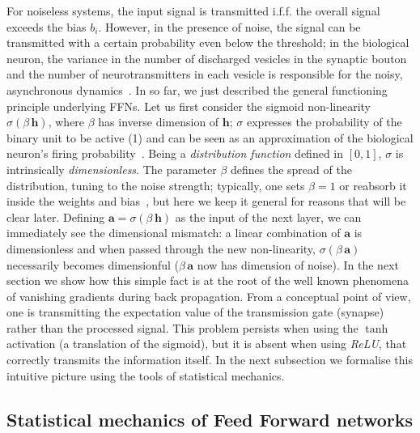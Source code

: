 \documentclass[5p]{elsarticle}
\begin{document}
For noiseless systems, the input signal is transmitted i.f.f. the overall signal exceeds the bias $b_i$. However, in the presence of noise, the signal can be transmitted with a certain probability even below the threshold; in the biological neuron, the variance in the number of discharged vesicles in the synaptic bouton and the number of neurotransmitters in each vesicle is responsible for the noisy, asynchronous dynamics~\cite{amit1}. In so far, we just described the general functioning principle underlying FFNs. Let us first consider the sigmoid non-linearity $\sigma(\beta \, \mathbf{h} )$, where $\beta$  has inverse dimension of $\mathbf{h}$;  $\sigma$ expresses the probability of the binary unit to be active (1) and can be seen as an approximation of the biological neuron's firing probability~\cite{amit1}. Being a {\it distribution function} defined in $[0,1]$, $\sigma$ is intrinsically {\it dimensionless}. The parameter $\beta$ defines the spread of the distribution, tuning to the noise strength; typically, one sets $\beta =1$ or reabsorb it inside the weights and bias~\cite{zecchina}, but here we keep it general for reasons that will be clear later. Defining $\mathbf{a} = \sigma(\beta \, \mathbf{h} )$ as the input of the next layer, we can immediately see the dimensional mismatch: a linear combination of $\mathbf{a}$ is dimensionless and when passed through the new non-linearity, $\sigma(\beta \, \mathbf{a} )$ necessarily becomes dimensionful ($\beta \, \mathbf{a}$ now has dimension of noise). In the next section we show how this simple fact is at the root of the well known phenomena of vanishing gradients during back propagation. From a conceptual point of view, one is transmitting the expectation value of the transmission gate (synapse) rather than the processed signal. This problem persists when using the $\tanh$ activation (a translation of the sigmoid), but it is absent when using {\it ReLU}, that correctly transmits the information itself. In the next subsection we formalise this intuitive picture using the tools of statistical mechanics.

\subsection{Statistical mechanics of Feed Forward networks}
\end{document}
